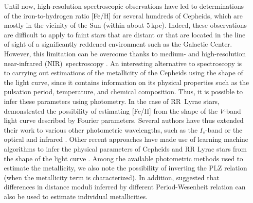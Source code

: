 \documentclass[article]{aa} %
\begin{document}
Until now, high-resolution spectroscopic observations have led to determinations of the iron-to-hydrogen ratio [Fe/H] for several hundreds of Cepheids, which are mostly in the vicinity of the Sun (within about 5$\,$kpc). Indeed, these observations are difficult to apply to faint stars that  are distant or that are located in the line of sight of a significantly reddened environment such as the Galactic Center. However, this limitation can be overcome thanks to medium- and high-resolution near-infrared (NIR)\ spectroscopy \citep{Inno2019,Kovtyukh2019,Kovtyukh2022IR}. An interesting alternative to spectroscopy is to carrying out estimations of the metallicity of the Cepheids using the shape of the light curve, since it contains information on its physical properties such as the pulsation period, temperature, and chemical composition.  Thus, it is possible to infer these parameters using photometry. In the case of RR~Lyrae stars, \cite{Jurcsik1996} demonstrated the possibility of estimating [Fe/H] from the shape of the $V$-band light curve described by Fourier parameters. Several authors have thus extended their work to various other photometric wavelengths, such as the $I_c$-band \citep{Smolec2005,Dekany2021} or the optical and infrared \citep{Mullen2021}. Other recent approaches have made use of learning machine algorithms to infer the physical parameters of Cepheids and RR Lyrae stars from the shape of the light curve \citep{Miller2015,Hajdu2018,Bellinger2020}. Among the available photometric methods used to estimate the metallicity, we also note the possibility of inverting the PLZ relation (when the metallicity term is characterized). In addition, \cite{Bono2010} suggested that differences in distance moduli inferred by different Period-Wesenheit relation can also be used to estimate individual metallicities.
\end{document}
